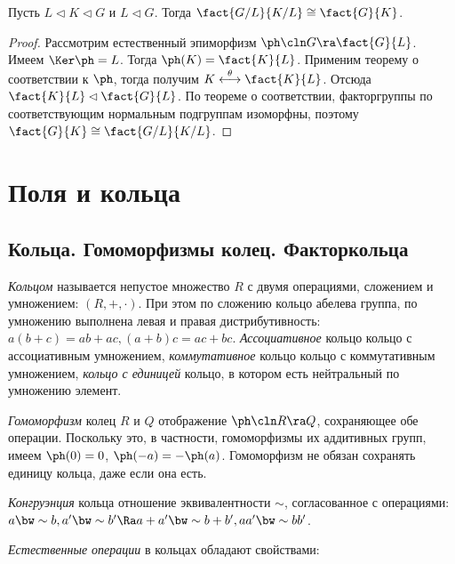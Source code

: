 \documentclass[a4paper]{article}
\newcommand{\kph}{\Ker \ph}
\begin{document}
\begin{theorem}
Пусть $L \lhd K \lhd G$ и $L \lhd G$. Тогда $\fact{G/L}{K/L} \cong \fact{G}{K}$.
\end{theorem}
\begin{proof}
Рассмотрим естественный эпиморфизм $\ph\cln G \ra \fact{G}{L}$. Имеем  $\kph = L$. Тогда $\ph(K) = \fact{K}{L}$.
Применим теорему о соответствии к $\ph$, тогда получим $K \overset{\theta}{\longleftrightarrow} \fact{K}{L}$.
Отсюда $\fact{K}{L} \lhd \fact{G}{L}$. По теореме о соответствии, факторгруппы по соответствующим нормальным
подгруппам изоморфны, поэтому $\fact{G}{K} \cong \fact{G/L}{K/L}$.
\end{proof}

\section{Поля и кольца}

\subsection{Кольца. Гомоморфизмы колец. Факторкольца}

\begin{df}
\emph{Кольцом} называется непустое множество $R$ с двумя операциями,  сложением и умножением:
$(R, +, \cdot)$. При этом по сложению кольцо абелева группа, по умножению выполнена левая и правая дистрибутивность:
$a(b+c)=ab+ac, (a+b)c=ac+bc$. \emph{Ассоциативное} кольцо кольцо с ассоциативным умножением,
\emph{коммутативное} кольцо кольцо с коммутативным умножением, \emph{кольцо с единицей} кольцо, в котором
есть нейтральный по умножению элемент.
\end{df}

\begin{df}
\emph{Гомоморфизм} колец $R$ и $Q$ отображение $\ph\cln R \ra Q$, сохраняющее  обе операции. Поскольку это, в
частности, гомоморфизмы их аддитивных групп, имеем $\ph(0)=0$, $\ph(-a)=-\ph(a)$. Гомоморфизм не обязан
сохранять единицу кольца, даже если она есть.
\end{df}

\begin{df}
\emph{Конгруэнция} кольца отношение
эквивалентности $\sim$, согласованное с операциями: $a \bw\sim b, a' \bw\sim b' \Ra a+a' \bw\sim b+b', aa' \bw\sim bb'$.
\end{df}

\emph{Естественные операции} в кольцах обладают свойствами:
\end{document}
